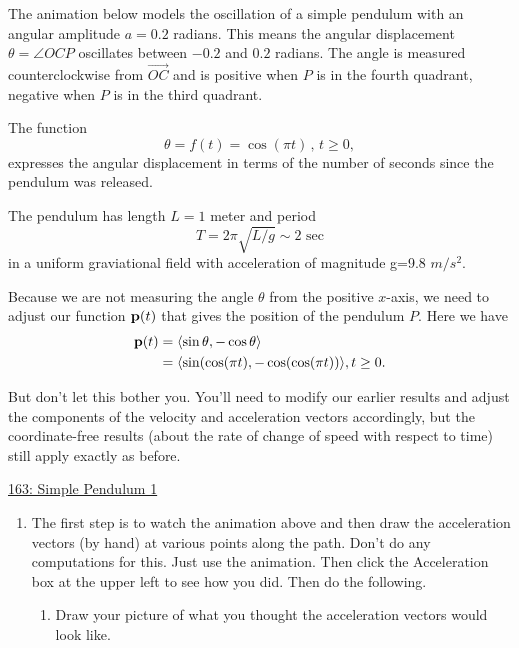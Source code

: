 \documentclass{ximera}
\begin{document}
\begin{question} \label{Qdsf3r34r5rt}
The animation below models the oscillation of a simple pendulum with an angular amplitude $a=0.2$ radians. This means the angular displacement $\theta  = \angle OCP$ oscillates between $-0.2$ and $0.2$ radians. The angle is measured counterclockwise from $\overrightarrow{OC}$ and is positive when $P$ is in the fourth quadrant, negative when $P$ is in the third quadrant.

The function 
\[
      \theta = f(t) = \cos (\pi t) \, , \, t\geq 0, 
\]
expresses the angular displacement in terms of the number of seconds since the pendulum was released. 

The pendulum has length $L=1$ meter and period
\[
  T  = 2\pi \sqrt{L/g} \sim 2 \text{ sec}
\]
in a uniform graviational field with acceleration of magnitude g=9.8 $m/s^2$.

Because we are not measuring the angle $\theta$ from the positive $x$-axis, we need to adjust our function ${\bf p}(t)$ that gives the position of the pendulum $P$. Here we have
\begin{align*}
   {\bf p}(t) &= \langle \sin \theta, -\cos\theta   \rangle  \\
                  &= \langle \sin (\cos (\pi t), - \cos (\cos (\pi t)) \rangle  , t \geq 0.
\end{align*}

But don't let this bother you. You'll need to modify our earlier results and adjust the components of the velocity and acceleration vectors accordingly, but the coordinate-free results (about the rate of change of speed with respect to time) still apply exactly as before.


\begin{onlineOnly}
    \begin{center}
\end{center}
\end{onlineOnly}

\href{https://www.geogebra.org/classic/gkbsdkrd}{163: Simple Pendulum 1}

\begin{enumerate}
\item The first step is to watch the animation above and then draw the acceleration vectors (by hand) at various points along the path. Don't do any computations for this. Just use the animation. Then click the Acceleration box at the upper left to see how you did. Then do the following.
\begin{enumerate}
\item Draw your picture of what you thought the acceleration vectors would look like.


\end{enumerate}
\end{enumerate}
\end{question}
\end{document}
